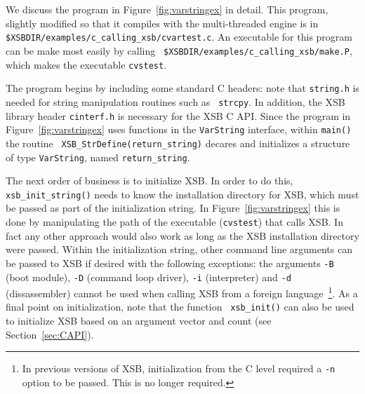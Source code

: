 We discuss the program in Figure~\ref{fig:varstringex} in detail.
This program, slightly modified so that it compiles with the
multi-threaded engine is in {\tt
  \$XSBDIR/examples/c\_calling\_xsb/cvartest.c}.  An executable for
this program can be make most easily by calling {\tt
  \$XSBDIR/examples/c\_calling\_xsb/make.P}, which makes the
executable {\tt cvstest}.

The program begins by including some standard C headers: note that
{\tt string.h} is needed for string manipulation routines such as {\tt
  strcpy}.  In addition, the XSB library header {\tt cinterf.h} is
necessary for the XSB C API.  Since the program in
Figure~\ref{fig:varstringex} uses functions in the {\tt VarString}
interface, within {\tt main()} the routine {\tt
  XSB\_StrDefine(return\_string)} decares and initializes a structure
of type {\tt VarString}, named {\tt return\_string}.

The next order of business is to initialize XSB.  In order to do this,
{\tt xsb\_init\_string()} needs to know the installation directory for
XSB, which must be passed as part of the initialization string.  In
Figure~\ref{fig:varstringex} this is done by manipulating the path of
the executable ({\tt cvstest}) that calls XSB.  In fact any other
approach would also work as long as the XSB installation directory
were passed.  Within the initialization string, other command line
arguments can be passed to XSB if desired with the following
exceptions: the arguments {\tt -B} (boot module), {\tt -D} (command
loop driver), {\tt -i} (interpreter) and {\tt -d} (dissassembler)
cannot be used when calling XSB from a foreign language~\footnote{In
  previous versions of XSB, initialization from the C level required a
  {\tt -n} option to be passed.  This is no longer required.}.  As a
final point on initialization, note that the function {\tt
  xsb\_init()} can also be used to initialize XSB based on an argument
vector and count (see Section~\ref{sec:CAPI}).

